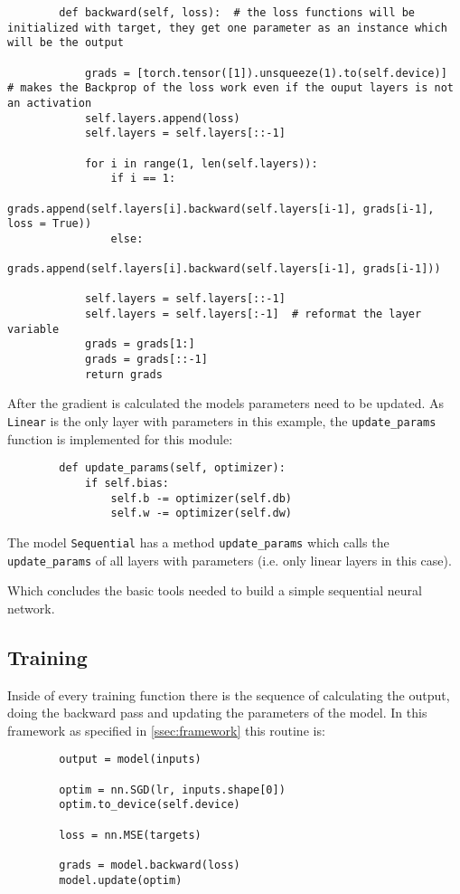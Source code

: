 \documentclass[11pt,english]{article}
\begin{document}
	\begin{lstlisting}
		def backward(self, loss):  # the loss functions will be initialized with target, they get one parameter as an instance which will be the output
			
			grads = [torch.tensor([1]).unsqueeze(1).to(self.device)]  # makes the Backprop of the loss work even if the ouput layers is not an activation
			self.layers.append(loss)
			self.layers = self.layers[::-1]
			
			for i in range(1, len(self.layers)):
				if i == 1:
					grads.append(self.layers[i].backward(self.layers[i-1], grads[i-1], loss = True))
				else:
					grads.append(self.layers[i].backward(self.layers[i-1], grads[i-1]))
			
			self.layers = self.layers[::-1]
			self.layers = self.layers[:-1]  # reformat the layer variable
			grads = grads[1:]
			grads = grads[::-1]
			return grads
	\end{lstlisting}
	
	After the gradient is calculated the models parameters need to be updated. As \lstinline|Linear| is the only layer with parameters in this example, the \lstinline|update_params| function is implemented for this module:
	
	\begin{lstlisting}
		def update_params(self, optimizer):
			if self.bias:
				self.b -= optimizer(self.db)
				self.w -= optimizer(self.dw)
	\end{lstlisting}
	
	The model \lstinline|Sequential| has a method \lstinline|update_params| which calls the \lstinline|update_params| of all layers with parameters (i.e. only linear layers in this case).
	
	Which concludes the basic tools needed to build a simple sequential neural network.
	
	\subsection{Training} \label{ssec:Training}
	
	Inside of every training function there is the sequence of calculating the output, doing the backward pass and updating the parameters of the model. In this framework as specified in \cref{ssec:framework} this routine is:
	
	\begin{lstlisting}
		output = model(inputs)
		
		optim = nn.SGD(lr, inputs.shape[0])
		optim.to_device(self.device)
		
		loss = nn.MSE(targets)
		
		grads = model.backward(loss)
		model.update(optim)
	\end{lstlisting} 
	
\end{document}
